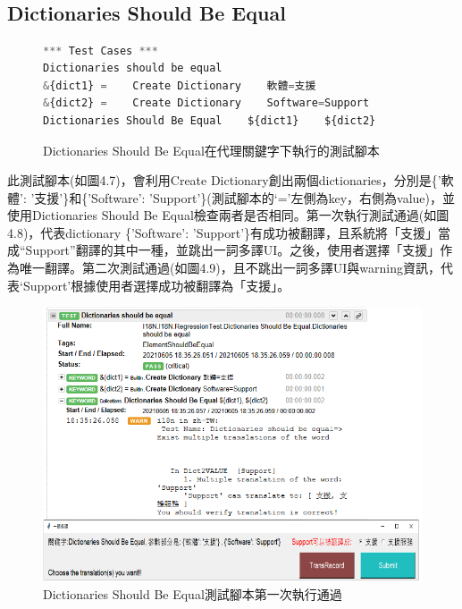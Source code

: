\hspace*{\fill} \\
\\ \hspace*{\fill} \\
\\ \hspace*{\fill} \\
\\ \hspace*{\fill} \\
\\ \hspace*{\fill} \\
\subsection{Dictionaries Should Be Equal}
\begin{figure}[H]
\begin{lstlisting}[language={python}]
*** Test Cases ***
Dictionaries should be equal
&{dict1} =    Create Dictionary    軟體=支援
&{dict2} =    Create Dictionary    Software=Support
Dictionaries Should Be Equal    ${dict1}    ${dict2}
\end{lstlisting}
\caption{Dictionaries Should Be Equal在代理關鍵字下執行的測試腳本}
\end{figure}
此測試腳本(如圖4.7)，會利用Create Dictionary創出兩個dictionaries，分別是\{'軟體': '支援'\}和\{'Software': 'Support'\}(測試腳本的‘=’左側為key，右側為value)，並使用Dictionaries Should Be Equal檢查兩者是否相同。第一次執行測試通過(如圖4.8)，代表dictionary \{'Software': 'Support'\}有成功被翻譯，且系統將「支援」當成“Support”翻譯的其中一種，並跳出一詞多譯UI。之後，使用者選擇「支援」作為唯一翻譯。第二次測試通過(如圖4.9)，且不跳出一詞多譯UI與warning資訊，代表‘Support’根據使用者選擇成功被翻譯為「支援」。

\begin{figure}[H]
\includegraphics[width= \textwidth]{../論文截圖/4.1.3-2 dictionaries should be equal 1st run.png}
\caption{Dictionaries Should Be Equal測試腳本第一次執行通過}
\end{figure}

